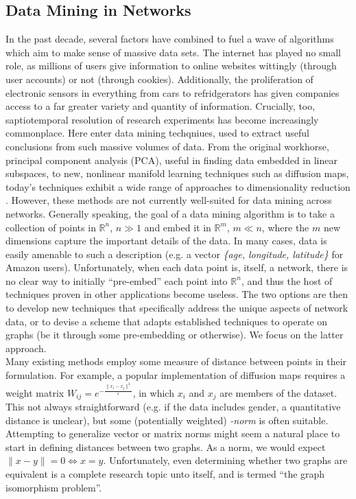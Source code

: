 \documentclass[11pt]{article}
\begin{document}
\subsection{Data Mining in Networks}
In the past decade, several factors have combined to fuel a wave of algorithms which aim to make sense of massive data sets. The internet has played no small role, as millions of users give information to online websites wittingly (through user accounts) or not (through cookies). Additionally, the proliferation of electronic sensors in everything from cars to refridgerators has given companies access to a far greater variety and quantity of information. Crucially, too, saptiotemporal resolution of research experiments has become increasingly commonplace. Here enter data mining techqniues, used to extract useful conclusions from such massive volumes of data. From the original workhorse, principal component analysis (PCA), useful in finding data embedded in linear subspaces, to new, nonlinear manifold learning techniques such as diffusion maps, today's techniques exhibit a wide range of approaches to dimensionality reduction \cite{data mining papers}. However, these methods are not currently well-suited for data mining across networks. Generally speaking, the goal of a data mining algorithm is to take a collection of points in $\mathbb{R}^{n}$, $n\gg1$ and embed it in $\mathbb{R}^{m}$, $m \ll n$, where the $m$ new dimensions capture the important details of the data. In many cases, data is easily amenable to such a description (e.g. a vector \textit{\{age, longitude, latitude\}} for Amazon users). Unfortunately, when each data point is, itself, a network, there is no clear way to initially ``pre-embed'' each point into $\mathbb{R}^{n}$, and thus the host of techniques proven in other applications become useless. The two options are then to develop new techniques that specifically address the unique aspects of network data, or to devise a scheme that adapts established techniques to operate on graphs (be it through some pre-embedding or otherwise). We focus on the latter approach. \vspace{1mm}\\
Many existing methods employ some measure of distance between points in their formulation. For example, a popular implementation of diffusion maps requires a weight matrix $W_{ij}=e^{-\frac{\|x_{i}-x_{j}\|^{2}}{\epsilon}}$, in which $x_{i}$ and $x_{j}$ are members of the dataset. This not always straightforward (e.g. if the data includes gender, a quantitative distance is unclear), but some (potentially weighted) \textit{-norm} is often suitable. Attempting to generalize vector or matrix norms might seem a natural place to start in defining distances between two graphs. As a norm, we would expect $\| x - y \| = 0 \Leftrightarrow x = y$. Unfortunately, even determining whether two graphs are equivalent is a complete research topic unto itself, and is termed ``the graph isomorphism problem''.
\end{document}
